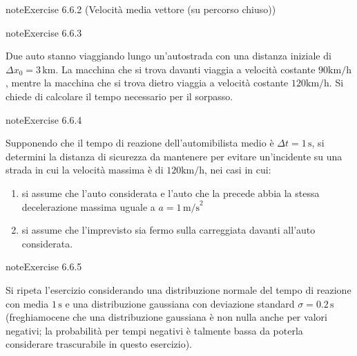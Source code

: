 \documentclass[letterpaper,10pt,italian]{jupyterBook}
\begin{document}
\begin{sphinxadmonition}{note}{Exercise 6.6.2 (Velocità media vettore (su percorso chiuso))}



\sphinxAtStartPar
{}
\end{sphinxadmonition}
 \label{exercise:ch/mechanics/kinematics-problems-exercise-2}

\begin{sphinxadmonition}{note}{Exercise 6.6.3}



\sphinxAtStartPar
Due auto stanno viaggiando lungo un’autostrada con una distanza iniziale di \(\Delta x_0 = 3 \, \text{km}\). La macchina che si trova davanti viaggia a velocità costante \(90 \text{km/h}\), mentre la macchina che si trova dietro viaggia a velocità costante \(120 \text{km/h}\). Si chiede di calcolare il tempo necessario per il sorpasso.
\end{sphinxadmonition}
 \label{exercise:ch/mechanics/kinematics-problems-exercise-3}

\begin{sphinxadmonition}{note}{Exercise 6.6.4}



\sphinxAtStartPar
Supponendo che il tempo di reazione dell’automibilista medio è \(\Delta t = 1 \, \text{s}\), si determini la distanza di sicurezza da mantenere per evitare un’incidente su una strada in cui la velocità massima è di \(120 \text{km/h}\), nei casi in cui:
\begin{enumerate}
%
\item {} 
\sphinxAtStartPar
si assume che l’auto considerata e l’auto che la precede abbia la stessa decelerazione massima uguale a \(a = 1 \, \text{m/s}^2\)

\item {} 
\sphinxAtStartPar
si assume che l’imprevisto sia fermo sulla carreggiata davanti all’auto considerata.

\end{enumerate}
\end{sphinxadmonition}
 \label{exercise:ch/mechanics/kinematics-problems-exercise-4}

\begin{sphinxadmonition}{note}{Exercise 6.6.5}



\sphinxAtStartPar
Si ripeta l’esercizio considerando una distribuzione normale del tempo di reazione con media \(1 \, \text{s}\) e una distribuzione gaussiana con deviazione standard \(\sigma = 0.2 \, \text{s}\) (freghiamocene che una distribuzione gaussiana è non nulla anche per valori negativi; la probabilità per tempi negativi è talmente bassa da poterla considerare trascurabile in questo esercizio).
\end{sphinxadmonition}
 \label{exercise:ch/mechanics/kinematics-problems-exercise-5}
\end{document}

